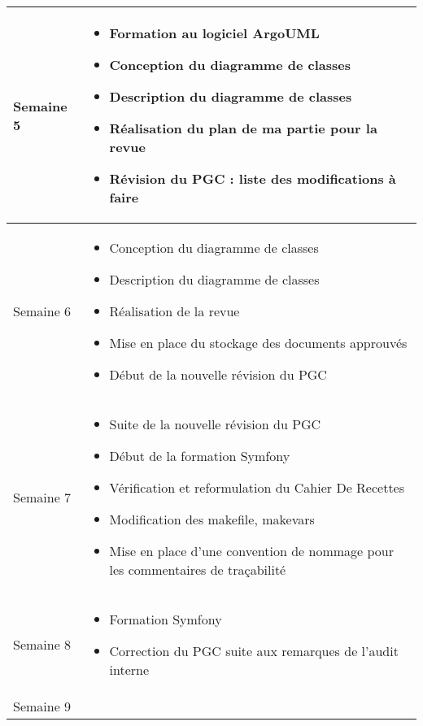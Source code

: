 \documentclass [a4paper] {article}
\begin{document}
\section*{\Mathieu}

\centering
	\begin{longtable}{|>{\columncolor{gray!40}}p{2cm}|p{12cm}|}
	\hline
	Semaine 5 & 
	\begin{itemize}
		\item Formation au logiciel ArgoUML
		\item Conception du diagramme de classes
		\item Description du diagramme de classes
		\item Réalisation du plan de ma partie pour la revue
		\item Révision du PGC : liste des modifications à faire
	\end{itemize} \\
	\hline
	Semaine 6 & 
	\begin{itemize}
		\item Conception du diagramme de classes
		\item Description du diagramme de classes
		\item Réalisation de la revue
		\item Mise en place du stockage des documents approuvés
		\item Début de la nouvelle révision du PGC
	\end{itemize} \\
	\hline
	Semaine 7 & 
	\begin{itemize}
		\item Suite de la nouvelle révision du PGC
		\item Début de la formation Symfony
		\item Vérification et reformulation du Cahier De Recettes
		\item Modification des makefile, makevars
		\item Mise en place d'une convention de nommage pour les commentaires de traçabilité
	\end{itemize} \\
	\hline	
	Semaine 8 & 
	\begin{itemize}
		\item Formation Symfony
		\item Correction du PGC suite aux remarques de l'audit interne
	\end{itemize} \\
	\hline
	Semaine 9 & 
	\begin{itemize}

\end{itemize}
\end{longtable}
\end{document}
